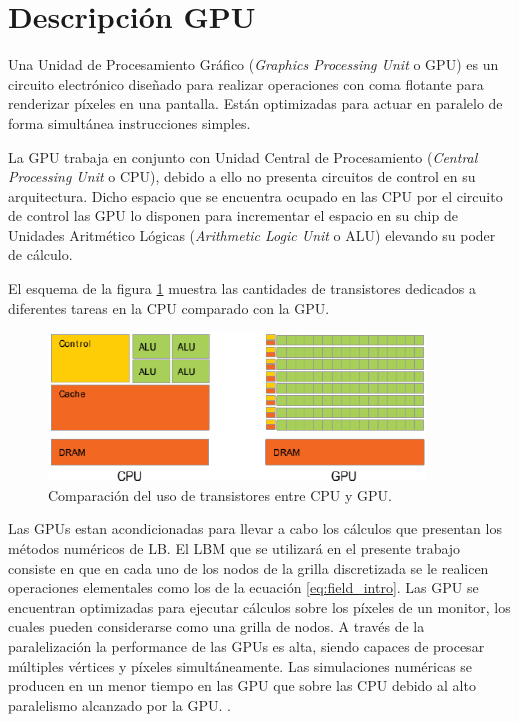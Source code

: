 \newpage
\section{Descripción GPU}

Una Unidad de Procesamiento Gráfico (\textit{Graphics Processing Unit} o GPU) es un  circuito electrónico diseñado para realizar operaciones con coma flotante para renderizar píxeles en una pantalla. Están optimizadas para actuar en paralelo de forma simultánea instrucciones simples.

La GPU trabaja en conjunto con Unidad Central de Procesamiento (\textit{Central Processing Unit} o CPU), debido a ello no presenta circuitos de control en su arquitectura. Dicho espacio que se encuentra ocupado en las CPU por el circuito de control las GPU lo disponen para incrementar el espacio en su chip de Unidades Aritmético Lógicas (\textit{Arithmetic Logic Unit} o ALU) elevando su poder de cálculo.

El esquema de la figura \ref{fig:cpu_gpu_transis} muestra las cantidades de transistores dedicados a diferentes tareas en la CPU comparado con la GPU.


\begin{figure}[h!]
	\centering
	\includegraphics[width=10cm]{cpu_gpu.png}
	\caption{Comparación del uso de transistores entre CPU y GPU.}
	\label{fig:cpu_gpu_transis}
\end{figure}

Las GPUs estan acondicionadas para llevar a cabo los cálculos que presentan los métodos numéricos de LB. El LBM que se utilizará en el presente trabajo consiste en que en cada uno de los nodos de la grilla discretizada se le realicen operaciones elementales como los de la ecuación \ref{eq:field_intro}. Las GPU se encuentran optimizadas para ejecutar cálculos sobre los píxeles de un monitor, los cuales pueden considerarse como una grilla de nodos. A través de la paralelización la performance de las GPUs es alta, siendo capaces de procesar múltiples vértices y píxeles simultáneamente. Las simulaciones numéricas se producen en un menor tiempo en las GPU que sobre las CPU debido al alto paralelismo alcanzado por la GPU. \cite{rinaldi2011modelos}.

